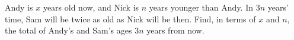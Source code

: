 Andy is $x$ years old now, and Nick is $n$ years younger than Andy. In $3n$ years' time, Sam will be twice as old as Nick will be then. Find, in terms of $x$ and $n$, the total of Andy's and Sam's ages $3n$ years from now.
